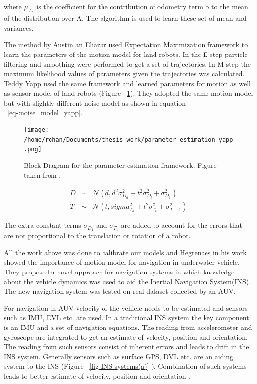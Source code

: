 \documentclass[12pt,draft]{dalcsthesis}
\begin{document}
where $\mu_{A_{b}}$ is the coefficient for the contribution of odometry term b to the mean of the distribution over A. The algorithm is used to learn these set of mean and variances.

The method by Austin an Eliazar used Expectation Maximization framework to learn the parameters of the motion model for land robots. In the E step particle filtering and smoothing were performed to get a set of trajectories. In M step the maximum likelihood values of parameters given the trajectories was calculated. Teddy Yapp \cite{Yap2008} used the same framework and learned parameters for motion as well as sensor model of land robots (Figure ~\ref{fig-parameter_estimation Yapp}). They adopted the same motion model but with slightly different noise model as shown in equation ~\ref{eq-:noise_model_yapp}.
\begin{figure}
  \centering
     {\texttt{[image: /home/rohan/Documents/thesis\_work/parameter\_estimation\_yapp.png]}}
  \caption{\label{fig-parameter_estimation Yapp} Block Diagram for the parameter estimation framework. Figure taken from \cite{Yapp2008}.}
\end{figure}

\begin{equation}
\label{eq-:noise_model_yapp}
\begin{aligned}
D &\sim& \mathcal{{N}}(d,d^2\sigma_{D_{d}}^2+t^2\sigma_{D_{t}}^2+\sigma_{D_{1}}^2) \\
T &\sim& \mathcal{{N}}(t,sigma_{T_{d}}^2+t^2\sigma_{T_{t}}^2+\sigma_{T-{1}}^2)
\end{aligned}
\end{equation}

The extra constant terms $\sigma_{D_{1}}$ and $\sigma_{T_{1}}$ are added to account for the errors that are not proportional to the translation or rotation of a robot. 

All the work above was done to calibrate our models and Hegrenaes \cite{Hegrenæs2008} in his work showed the importance of motion model for navigation in underwater vehicle. They proposed a novel approach for navigation systems in which knowledge about the vehicle dynamics was used to aid the Inertial Navigation System(INS). The new navigation system was tested on real dataset collected by an AUV.

For navigation in AUV velocity of the vehicle needs to be estimated and sensors such as IMU, DVL etc. are used. In a traditional INS system the key component is an IMU and a set of navigation equations. The reading from accelerometer and gyroscope are integrated to get an estimate of velocity, position and orientation. The reading from such sensors consist of inherent errors and leads to drift in the INS system. Generally sensors such as surface GPS, DVL etc. are an aiding system to the INS (Figure ~\ref{fig-INS systems(a)} ). Combination of such systems leads to better estimate of velocity, position and orientation \cite{leonard1998autonomous}. 
\end{document}
